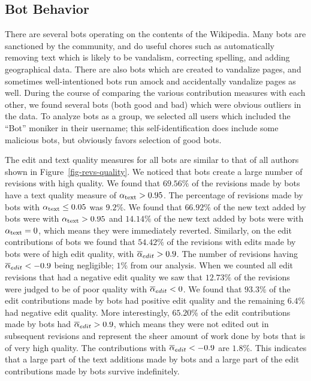 \subsection{Bot Behavior}

There are several bots operating on the contents of the Wikipedia.
Many bots are sanctioned by the community, and do useful
chores such as automatically removing text which is likely
to be vandalism, correcting spelling, and adding geographical data.
There are also bots which are created to vandalize pages,
and sometimes well-intentioned bots run amock and
accidentally vandalize pages as well.
During the course of comparing the various contribution
measures with each other, we found several bots (both
good and bad) which were obvious outliers in the data.
To analyze bots as a group, we selected all users
which included the ``Bot'' moniker in their username;
this self-identification does include some malicious bots,
but obviously favors selection of good bots.

The edit and text quality measures for all bots are similar to
that of all authors shown in Figure~\ref{fig-revs-quality}.
We noticed that bots create a large number of revisions with
high quality.
We found that $69.56\%$ of the revisions made by
bots have a text quality measure of $\alpha_\text{text} > 0.95$.
The percentage of revisions made by bots with 
$\alpha_\text{text} \le 0.05$ was $9.2\%$.
We found that $66.92\%$ of the new text added by bots were with
$\alpha_\text{text} > 0.95$ and $14.14\%$ of the new text added by
bots were with $\alpha_\text{text} = 0$, which means they were 
immediately reverted.
Similarly, on the edit contributions of bots we found that
$54.42\%$ of the revisions with edits made by bots were of
high edit quality, with ${\overline{\alpha}}_{edit} > 0.9$.
The number of revisions having ${\overline{\alpha}}_{edit} < -0.9$ being
negligible; $1\%$ from our analysis.
When we counted all edit revisions that had a negative edit
quality we saw that $12.73\%$ of the revisions were judged to 
be of poor quality with ${\overline{\alpha}}_{edit} < 0$.
We found that $93.3\%$ of the edit contributions made by bots
had positive edit quality and the remaining $6.4\%$ had
negative edit quality.
More interestingly, $65.20\%$ of the edit contributions made
by bots had ${\overline{\alpha}}_{edit} > 0.9$, which means they were
not edited out in subsequent revisions and represent the
sheer amount of work done by bots that is of very high quality.
The contributions with ${\overline{\alpha}}_{edit} < -0.9$ are $1.8\%$.
This indicates that a large part of the text additions made by bots 
and a large part of the edit contributions made by bots survive
indefinitely.

